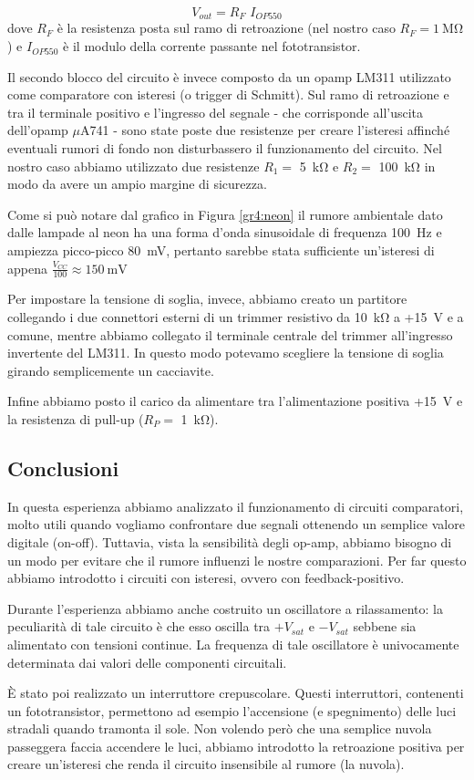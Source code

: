 \begin{equation}
	V_{out} = R_F \,\, I_{OP550}
\end{equation}
dove $R_F$ è la resistenza posta sul ramo di retroazione (nel nostro caso $R_F = \SI{1}{\Mohm}$) e $I_{OP550}$ è il modulo della corrente passante nel fototransistor.

Il secondo blocco del circuito è invece composto da un opamp LM311 utilizzato come comparatore con isteresi (o trigger di Schmitt).
Sul ramo di retroazione e tra il terminale positivo e l'ingresso del segnale - che corrisponde all'uscita dell'opamp $\mu$A741 - sono state poste due resistenze per creare l'isteresi affinché eventuali rumori di fondo non disturbassero il funzionamento del circuito.
Nel nostro caso abbiamo utilizzato due resistenze $R_1 =$ \SI{5}{\kohm} e $R_2=$ \SI{100}{\kohm} in modo da avere un ampio margine di sicurezza.

Come si può notare dal grafico in Figura \ref{gr4:neon} il rumore ambientale dato dalle lampade al neon ha una forma d'onda sinusoidale di frequenza \SI{100}{\hertz} e ampiezza picco-picco \SI{80}{\mV}, pertanto sarebbe stata sufficiente un'isteresi di appena $\frac{V_{CC}}{100} \approx \SI{150}{\mV}$

Per impostare la tensione di soglia, invece, abbiamo creato un partitore collegando i due connettori esterni di un trimmer resistivo da \SI{10}{\kohm} a +\SI{15}{\V} e a comune, mentre abbiamo collegato il terminale centrale del trimmer all'ingresso invertente del LM311.
In questo modo potevamo scegliere la tensione di soglia girando semplicemente un cacciavite.

Infine abbiamo posto il carico da alimentare tra l'alimentazione positiva +\SI{15}{\V} e la resistenza di pull-up ($R_P=$ \SI{1}{\kohm}).

\subsection*{Conclusioni}

In questa esperienza abbiamo analizzato il funzionamento di circuiti comparatori, molto utili quando vogliamo confrontare due segnali ottenendo un semplice valore digitale (on-off).
Tuttavia, vista la sensibilità degli op-amp, abbiamo bisogno di un modo per evitare che il rumore influenzi le nostre comparazioni.
Per far questo abbiamo introdotto i circuiti con isteresi, ovvero con feedback-positivo.

Durante l'esperienza abbiamo anche costruito un oscillatore a rilassamento: la peculiarità di tale circuito è che esso oscilla tra $+V_{sat}$ e $-V_{sat}$ sebbene sia alimentato con tensioni continue.
La frequenza di tale oscillatore è univocamente determinata dai valori delle componenti circuitali.

È stato poi realizzato un interruttore crepuscolare.
Questi interruttori, contenenti un fototransistor, permettono ad esempio l'accensione (e spegnimento) delle luci stradali quando tramonta il sole.
Non volendo però che una semplice nuvola passeggera faccia accendere le luci, abbiamo introdotto la retroazione positiva per creare un'isteresi che renda il circuito insensibile al rumore (la nuvola).